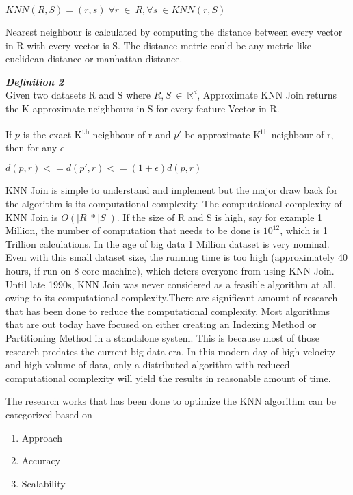 \medskip

\begin{center}
     $KNN(R,S) = {(r,s) | \forall r\ \in\ R, \forall s\ \in KNN(r,S)
     } $
\end{center}

Nearest neighbour is calculated by computing the distance between every vector
in R with every vector is S. The distance metric could be any metric
like euclidean distance or manhattan distance.

\medskip

\textbf{\emph{Definition 2}} \\
 Given two datasets R and S where $R,S\ \in\ \mathbb{R}^d$, Approximate KNN Join returns the K
approximate neighbours in S for every feature Vector in R.

\medskip

If $p$ is the exact K\textsuperscript{th} neighbour of r and $p'$ be approximate
K\textsuperscript{th} neighbour of r, then for any $\epsilon$

\bigskip

\begin{center}
$d(p,r) <= d(p',r) <= (1+\epsilon) d(p,r)$
\end{center}

\bigskip

KNN Join is simple to understand and implement but the major draw back
for the algorithm is its computational complexity. The computational
complexity of KNN Join is $ O(|R|*|S|)$. If the size of R and S is high,
say for example 1 Million, the number of computation that needs to be
done is $10^{12}$, which is 1 Trillion calculations. In the age of big data 1
Million dataset is very nominal. Even with this small dataset size, the
running time is too high (approximately 40 hours, if run on 8 core machine), which
deters everyone from using KNN Join. Until late 1990s, KNN Join was
never considered as a feasible algorithm at all, owing to its computational
complexity.There are significant amount of research that has been done to reduce the
computational complexity. Most algorithms that are out today have focused
on either creating an Indexing Method or Partitioning Method in a standalone system. This is because most of those research predates the
current big data era. In this modern day of high velocity and high volume of data,
only a distributed algorithm with reduced computational complexity will yield the results in reasonable amount of time.

The research works that has been done to optimize the KNN algorithm can be categorized based on
\begin{enumerate}
\item Approach
\item Accuracy
\item Scalability
\end{enumerate}



